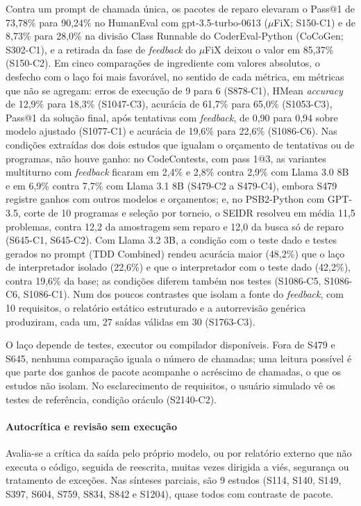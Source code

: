 Contra um prompt de chamada única, os pacotes de reparo elevaram o Pass@1 de 73,78\% para 90,24\% no HumanEval com gpt-3.5-turbo-0613 ($\mu$FiX; S150-C1) e de 8,73\% para 28,0\% na divisão Class Runnable do CoderEval-Python (CoCoGen; S302-C1), e a retirada da fase de \textit{feedback} do $\mu$FiX deixou o valor em 85,37\% (S150-C2).
Em cinco comparações de ingrediente com valores absolutos, o desfecho com o laço foi mais favorável, no sentido de cada métrica, em métricas que não se agregam: erros de execução de 9 para 6 (S878-C1), HMean \textit{accuracy} de 12,9\% para 18,3\% (S1047-C3), acurácia de 61,7\% para 65,0\% (S1053-C3), Pass@1 da solução final, após tentativas com \textit{feedback}, de 0,90 para 0,94 sobre modelo ajustado (S1077-C1) e acurácia de 19,6\% para 22,6\% (S1086-C6).
Nas condições extraídas dos dois estudos que igualam o orçamento de tentativas ou de programas, não houve ganho: no CodeContests, com pass 1@3, as variantes multiturno com \textit{feedback} ficaram em 2,4\% e 2,8\% contra 2,9\% com Llama 3.0 8B e em 6,9\% contra 7,7\% com Llama 3.1 8B (S479-C2 a S479-C4), embora S479 registre ganhos com outros modelos e orçamentos; e, no PSB2-Python com GPT-3.5, corte de 10 programas e seleção por torneio, o SEIDR resolveu em média 11,5 problemas, contra 12,2 da amostragem sem reparo e 12,0 da busca só de reparo (S645-C1, S645-C2).
Com Llama 3.2 3B, a condição com o teste dado e testes gerados no prompt (TDD Combined) rendeu acurácia maior (48,2\%) que o laço de interpretador isolado (22,6\%) e que o interpretador com o teste dado (42,2\%), contra 19,6\% da base; as condições diferem também nos testes (S1086-C5, S1086-C6, S1086-C1).
Num dos poucos contrastes que isolam a fonte do \textit{feedback}, com 10 requisitos, o relatório estático estruturado e a autorrevisão genérica produziram, cada um, 27 saídas válidas em 30 (S1763-C3).

O laço depende de testes, executor ou compilador disponíveis. Fora de S479 e S645, nenhuma comparação iguala o número de chamadas; uma leitura possível é que parte dos ganhos de pacote acompanhe o acréscimo de chamadas, o que os estudos não isolam. No esclarecimento de requisitos, o usuário simulado vê os testes de referência, condição oráculo (S2140-C2).

\paragraph{Autocrítica e revisão sem execução}
Avalia-se a crítica da saída pelo próprio modelo, ou por relatório externo que não executa o código, seguida de reescrita, muitas vezes dirigida a viés, segurança ou tratamento de exceções. Nas sínteses parciais, são 9 estudos (S114, S140, S149, S397, S604, S759, S834, S842 e S1204), quase todos com contraste de pacote.

